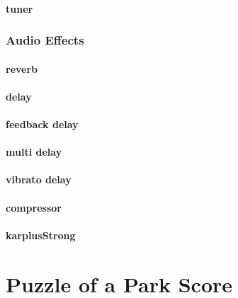 \subsubsection{tuner}
\vspace{5mm}

\subsection{Audio Effects}


\subsubsection{reverb}
\vspace{5mm}

\subsubsection{delay}
\vspace{5mm}

\subsubsection{feedback delay}
\vspace{5mm}

\subsubsection{multi delay}
\vspace{5mm}

\subsubsection{vibrato delay}
\vspace{5mm}

\subsubsection{compressor}
\vspace{5mm}

\subsubsection{karplusStrong}
\vspace{5mm}



\chapter{Puzzle of a Park Score}

